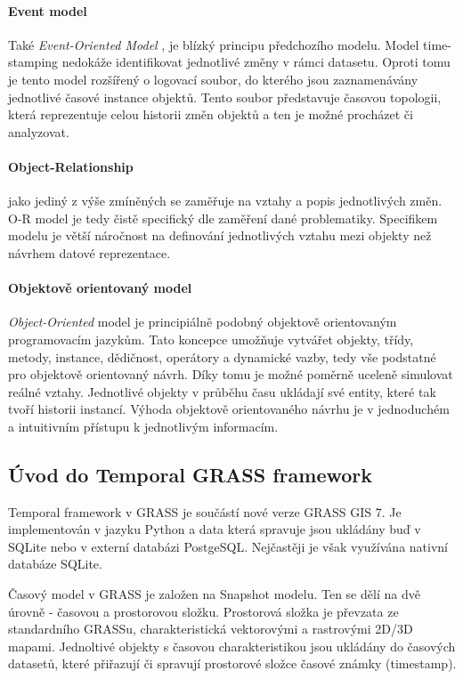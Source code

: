 \documentclass[a4paper,12pt,oneside]{report}
\begin{document}
\paragraph*{Event model}
Také \textit{Event-Oriented Model }, je blízký principu předchozího modelu. Model time-stamping nedokáže identifikovat jednotlivé změny v rámci datasetu. Oproti tomu je tento model rozšířený  o logovací soubor, do kterého jsou zaznamenávány jednotlivé časové instance objektů. Tento soubor představuje časovou topologii, která reprezentuje celou historii změn objektů a ten je možné procházet či analyzovat.

\paragraph*{Object-Relationship}
jako jediný z výše zmíněných se zaměřuje na vztahy a popis jednotlivých změn. O-R model je tedy čistě specifický dle zaměření dané problematiky. Specifikem  modelu je větší náročnost na definování jednotlivých vztahu mezi objekty než návrhem datové reprezentace. 

\paragraph*{Objektově orientovaný model}
\textit{Object-Oriented} model je principiálně podobný objektově orientovaným programovacím jazykům. Tato koncepce umožňuje vytvářet  objekty, třídy, metody, instance, dědičnost, operátory a dynamické vazby, tedy vše podstatné pro objektově orientovaný návrh. Díky tomu je možné poměrně uceleně simulovat reálné vztahy.  Jednotlivé objekty v průběhu času ukládají své entity, které tak tvoří historii instancí. Výhoda objektově orientovaného návrhu je v jednoduchém a intuitivním přístupu k jednotlivým informacím. 



\subsection{Úvod do Temporal GRASS framework}
Temporal framework v GRASS je součástí nové verze GRASS GIS 7. Je implementován v jazyku Python a data která spravuje jsou ukládány buď v SQLite nebo v externí databázi PostgeSQL. Nejčastěji je však využívána nativní databáze SQLite.

Časový model v GRASS je založen na Snapshot modelu. Ten se dělí na dvě úrovně - časovou a prostorovou složku. Prostorová složka je převzata ze standardního  GRASSu, charakteristická vektorovými a rastrovými 2D/3D mapami. Jednoltivé objekty s časovou charakteristikou jsou ukládány do  časových datasetů, které přiřazují či spravují prostorové složce časové známky (timestamp).
\end{document}
